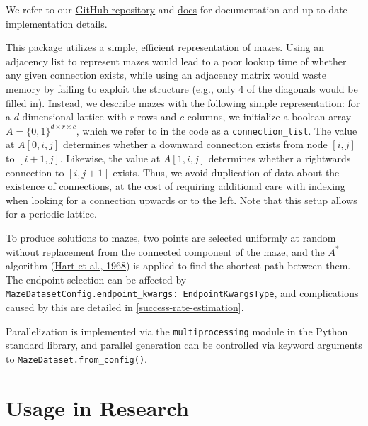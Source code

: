 \documentclass[10pt,a4paper,onecolumn]{article}
\begin{document}
We refer to our
\href{https://github.com/understanding-search/maze-dataset}{GitHub repository}
and
\href{https://understanding-search.github.io/maze-dataset/maze_dataset.html}{docs}
for documentation and up-to-date implementation details.

This package utilizes a simple, efficient representation of mazes. Using
an adjacency list to represent mazes would lead to a poor lookup time of
whether any given connection exists, while using an adjacency matrix
would waste memory by failing to exploit the structure (e.g., only 4 of
the diagonals would be filled in). Instead, we describe mazes with the
following simple representation: for a \(d\)-dimensional lattice with
\(r\) rows and \(c\) columns, we initialize a boolean array
\(A = \{0, 1\}^{d \times r \times c}\), which we refer to in the code as
a \texttt{connection\_list}. The value at \(A[0,i,j]\) determines
whether a downward connection exists from node \([i,j]\) to
\([i+1, j]\). Likewise, the value at \(A[1,i,j]\) determines whether a
rightwards connection to \([i, j+1]\) exists. Thus, we avoid duplication
of data about the existence of connections, at the cost of requiring
additional care with indexing when looking for a connection upwards or
to the left. Note that this setup allows for a periodic lattice.

To produce solutions to mazes, two points are selected uniformly at
random without replacement from the connected component of the maze, and
the \(A^*\) algorithm (\protect\hyperlink{ref-A_star}{Hart et al.,
1968}) is applied to find the shortest path between them. The endpoint
selection can be affected by
\texttt{MazeDatasetConfig.endpoint\_kwargs:\ EndpointKwargsType}, and
complications caused by this are detailed in
\autoref{success-rate-estimation}.

Parallelization is implemented via the \texttt{multiprocessing} module
in the Python standard library, and parallel generation can be
controlled via keyword arguments to
\href{https://understanding-search.github.io/maze-dataset/maze_dataset.html\#MazeDataset.from_config}{\texttt{MazeDataset.from\_config()}}.

\hypertarget{usage-in-research}{%
\section{Usage in Research}\label{usage-in-research}}
\end{document}
